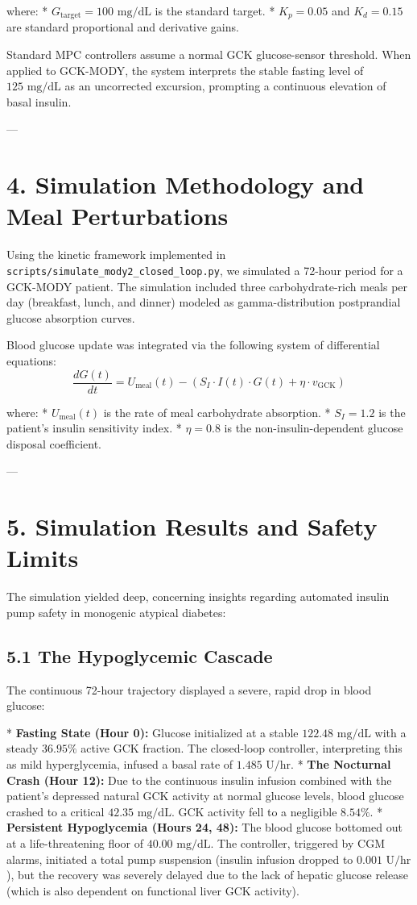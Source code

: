 \documentclass[11pt,twocolumn]{article}
\begin{document}
where:
*   $G_{\text{target}} = 100 \text{ mg/dL}$ is the standard target.
*   $K_p = 0.05$ and $K_d = 0.15$ are standard proportional and derivative gains.

Standard MPC controllers assume a normal GCK glucose-sensor threshold. When applied to GCK-MODY, the system interprets the stable fasting level of $125\text{ mg/dL}$ as an uncorrected excursion, prompting a continuous elevation of basal insulin.

---

\section{4. Simulation Methodology and Meal Perturbations}
Using the kinetic framework implemented in \texttt{scripts/simulate_mody2_closed_loop.py}, we simulated a 72-hour period for a GCK-MODY patient. The simulation included three carbohydrate-rich meals per day (breakfast, lunch, and dinner) modeled as gamma-distribution postprandial glucose absorption curves. 

Blood glucose update was integrated via the following system of differential equations:
$$\frac{dG(t)}{dt} = U_{\text{meal}}(t) - \left(S_I \cdot I(t) \cdot G(t) + \eta \cdot v_{\text{GCK}}\right)$$

where:
*   $U_{\text{meal}}(t)$ is the rate of meal carbohydrate absorption.
*   $S_I = 1.2$ is the patient's insulin sensitivity index.
*   $\eta = 0.8$ is the non-insulin-dependent glucose disposal coefficient.

---

\section{5. Simulation Results and Safety Limits}
The simulation yielded deep, concerning insights regarding automated insulin pump safety in monogenic atypical diabetes:

\subsection{5.1 The Hypoglycemic Cascade}
The continuous 72-hour trajectory displayed a severe, rapid drop in blood glucose:

*   \textbf{Fasting State (Hour 0):} Glucose initialized at a stable $122.48\text{ mg/dL}$ with a steady $36.95\%$ active GCK fraction. The closed-loop controller, interpreting this as mild hyperglycemia, infused a basal rate of $1.485\text{ U/hr}$.
*   \textbf{The Nocturnal Crash (Hour 12):} Due to the continuous insulin infusion combined with the patient's depressed natural GCK activity at normal glucose levels, blood glucose crashed to a critical \textbf{$42.35\text{ mg/dL}$}. GCK activity fell to a negligible $8.54\%$.
*   \textbf{Persistent Hypoglycemia (Hours 24, 48):} The blood glucose bottomed out at a life-threatening floor of \textbf{$40.00\text{ mg/dL}$}. The controller, triggered by CGM alarms, initiated a total pump suspension (insulin infusion dropped to $0.001\text{ U/hr}$), but the recovery was severely delayed due to the lack of hepatic glucose release (which is also dependent on functional liver GCK activity).
\end{document}
